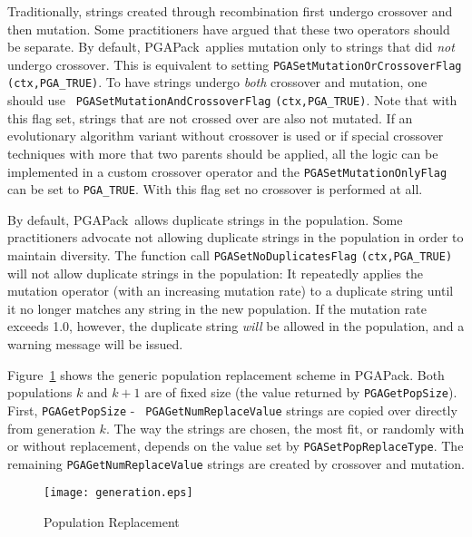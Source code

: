 \documentclass{report}
\newcommand{\pga}{PGAPack}
\begin{document}
\begin{sloppypar}
Traditionally, strings created through recombination first undergo crossover
and then mutation.  Some practitioners \cite{Da91} have argued that these two
operators should be separate.  By default, \pga\ applies mutation only to
strings that did {\em not} undergo crossover.  This is equivalent to setting
{\tt PGASetMutationOrCrossoverFlag} {\tt (ctx,PGA\_TRUE)}.  To have strings
undergo {\em both} crossover and mutation, one should use {\tt
PGASetMutationAndCrossoverFlag} {\tt (ctx,PGA\_TRUE)}. Note that with
this flag set, strings that are not crossed over are also not mutated.
If an evolutionary algorithm variant without crossover is used or if
special crossover techniques with more that two parents should be
applied, all the logic can be implemented in a custom crossover operator
and the \verb+PGASetMutationOnlyFlag+ can be set to \verb+PGA_TRUE+.
With this flag set no crossover is performed at all.
\end{sloppypar}

By default, \pga\ allows duplicate strings in the population.  Some
practitioners advocate not allowing duplicate strings in the population in
order to maintain diversity.  The function call {\tt PGASetNoDuplicatesFlag}
{\tt (ctx,PGA\_TRUE)} will not allow duplicate strings in the population: It
repeatedly applies the mutation operator (with an increasing mutation rate) to
a duplicate string until it no longer matches any string in the new
population.  If the mutation rate exceeds 1.0, however, the duplicate string
{\em will} be allowed in the population, and a warning message will be issued.

Figure~\ref{fig:popreplace} shows the generic population replacement scheme in
\pga.  Both populations $k$ and $k+1$  are of fixed size (the value returned by
{\tt PGAGetPopSize}).  First, {\tt PGAGetPopSize} - {\tt
PGAGetNumReplaceValue} strings are copied over directly from generation $k$.
The way the strings are chosen, the most fit, or randomly with or without
replacement, depends on the value set by {\tt PGASetPopReplaceType}.  The
remaining {\tt PGAGetNumReplaceValue} strings are created by crossover and
mutation.

\begin{figure}
\centerline{\texttt{[image: generation.eps]}}
\caption{Population Replacement}\label{fig:popreplace}
\end{figure}


\end{document}
